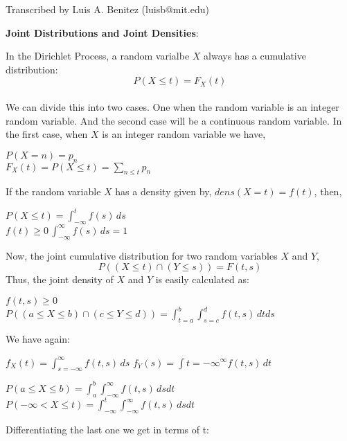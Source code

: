 \newline
{}\newline
\noindent Transcribed by Luis A. Benitez (luisb@mit.edu)\newline

{\bf Joint Distributions and Joint Densities}:

In the Dirichlet Process, a random varialbe $X$ always has a cumulative distribution:
\begin{displaymath}
P(X \leq t) = F_X(t)
\end{displaymath}\\
We can divide this into two cases.  One when the random variable is an integer random variable.  And the second case will be a continuous random variable.  In the first case, when $X$ is an integer random variable we have,
\begin{center}
$P(X=n) = p_n$\\
$F_X(t) = P(X \leq t) = \sum_{n \leq t} p_n$\\
\end{center}
If the random variable $X$ has a density given by, $dens(X=t) = f(t)$, then,
\begin{center}
$P(X \leq t) = \int_{-\infty}^{t} f(s)\, ds$\\ 
$f(t) \geq 0 \, \int_{-\infty}^{\infty} f(s)\, ds = 1$\\
\end{center}
Now, the joint cumulative distribution for two random variables $X$ and $Y$,
\begin{displaymath}
P((X \leq t) \cap (Y \leq s)) = F(t,s)
\end{displaymath}
Thus, the joint density of $X$ and $Y$ is easily calculated as:
\begin{center}
$f(t,s) \geq 0$\\
$P((a \leq X \leq b) \cap (c \leq Y \leq d))= \int_{t=a}^{b} \int_{s=c}^{d} f(t,s) \, dtds$\\
\end{center}
We have again:
\begin{center}
$f_X(t) = \int_{s=-\infty}^\infty f(t,s) \, ds$
$f_Y(s) = \int{t=-\infty}^\infty f(t,s) \, dt$
\end{center}
\begin{center}
$P(a \leq X \leq b) = \int_a^b \int_{-\infty}^\infty f(t,s)\, ds dt$
$P(-\infty < X \leq t) = \int_{-\infty}^t \int_{-\infty}^\infty f(t,s)\, ds dt$
\end{center}
Differentiating the last one we get in terms of t:

